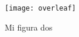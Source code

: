 \lipsum[1-1] \cite{texbook}

\begin{figure}[H]
    \centering
    \texttt{[image: overleaf]}
    \caption{Mi figura dos}\label{fig:fig2}
\end{figure}

